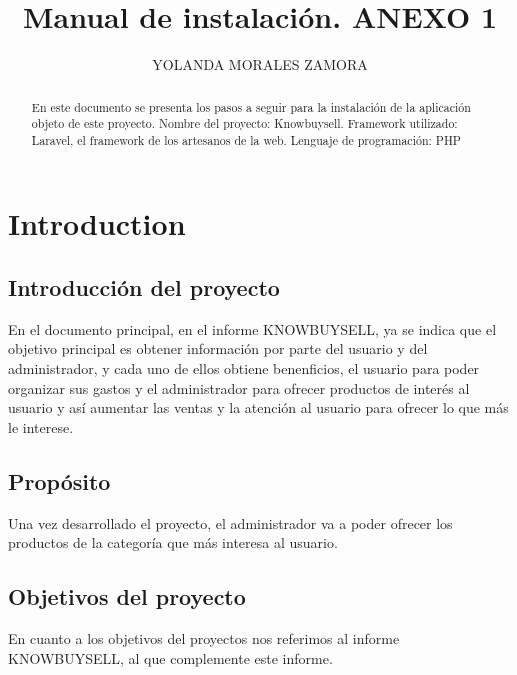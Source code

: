 \documentclass{article}
\title{Manual de instalación. ANEXO 1}
\author{YOLANDA MORALES ZAMORA}
\begin{document}
\maketitle

\begin{abstract}
En este documento se presenta los pasos a seguir para la instalación de la aplicación objeto de este proyecto.
Nombre del proyecto: Knowbuysell.
Framework utilizado: Laravel, el framework de los artesanos de la web.
Lenguaje de programación: PHP

\end{abstract}

\section{Introduction}
\subsection{Introducción del proyecto}
En el documento principal, en el informe KNOWBUYSELL, ya se indica que el objetivo principal es obtener información por parte del usuario y del administrador, y cada uno de ellos obtiene benenficios, el usuario para poder organizar sus gastos y el administrador para ofrecer productos de interés al usuario y así aumentar las ventas y la atención al usuario para ofrecer lo que más le interese.
\subsection{Propósito}
Una vez desarrollado el proyecto, el administrador va a poder ofrecer los productos de la categoría que más interesa al usuario.
\subsection{Objetivos del proyecto}
En cuanto a los objetivos del proyectos nos referimos al informe KNOWBUYSELL, al que complemente este informe.
\end{document}
